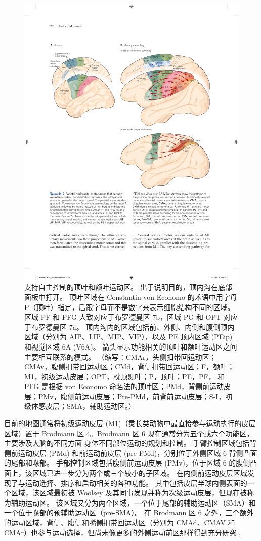 \begin{figure}[htbp]
	\centering
	\includegraphics[width=0.95\linewidth]{chap34/fig_34_2}
	\caption{支持自主控制的顶叶和额叶运动区。 出于说明目的，顶内沟在底部面板中打开。 顶叶区域在 Constantin von Economo 的术语中用字母 P（顶叶）指定，后跟字母而不是数字来表示细胞结构不同的区域。 区域 PF 和 PFG 大致对应于布罗德曼区 7b，区域 PG 和 OPT 对应于布罗德曼区 7a。 顶内沟内的区域包括前、外侧、内侧和腹侧顶内区域（分别为 AIP、LIP、MIP、VIP），以及 PE 顶内区域 (PEip) 和视觉区域 6A (V6A)。 箭头显示功能相关的顶叶和额叶运动区之间主要相互联系的模式。 （缩写：CMAr，头侧扣带回运动区；CMAv，腹侧扣带回运动区；CMd，背侧扣带回运动区；F，额叶；M1，初级运动皮层；OPT，枕顶颞叶；P，顶叶；PE，PF， 和 PFG 是根据 von Economo 命名法的顶叶区；PMd，背侧前运动皮层；PMv，腹侧前运动皮层；Pre-PMd，前背前运动皮层；S-I，初级体感皮层；SMA，辅助运动区。）}
	\label{fig:34_2}
\end{figure}

目前的地图通常将初级运动皮层 (M1)（灵长类动物中最直接参与运动执行的皮层区域）置于 Brodmann 区 4。Brodmann 区 6 现在通常分为五个或六个功能区，主要涉及大脑的不同方面 身体不同部位运动的规划和控制。 手臂控制区域包括背侧前运动皮层 (PMd) 和前运动前皮层 (pre-PMd)，分别位于外侧区域 6 背侧凸面的尾部和喙部。 手部控制区域包括腹侧前运动皮层 (PMv)，位于区域 6 的腹侧凸面上，该区域已进一步分为两个或三个较小的子区域。 在内侧前运动皮层区域发现了与运动选择、排序和启动相关的各种功能。 其中包括皮层半球内侧表面的一个区域，该区域最初被 Woolsey 及其同事发现并称为次级运动皮层，但现在被称为辅助运动区。 该区域又分为两个区域，一个位于尾部的辅助运动区（SMA）和一个位于喙部的预辅助运动区（pre-SMA）。 在 Brodmann 区 6 之外，三个额外的运动区域，背侧、腹侧和嘴侧扣带回运动区（分别为 CMAd、CMAV 和 CMAr）也参与运动选择，但尚未像更多的外侧运动前区那样得到充分研究 .

